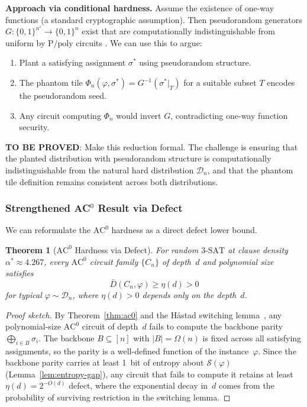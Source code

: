 \documentclass[11pt]{article}
\newtheorem{theorem}{Theorem}[section]
\theoremstyle{definition}
\theoremstyle{remark}
\newcommand{\calD}{\mathcal{D}}
\newcommand{\calS}{\mathcal{S}}
\newcommand{\Ppoly}{\mathrm{P/poly}}
\newcommand{\ACz}{\mathrm{AC}^0}
\newcommand{\threeSAT}{\mathrm{3\text{-}SAT}}
\begin{document}
\textbf{Approach via conditional hardness.}  Assume the existence of one-way
functions (a standard cryptographic assumption).  Then pseudorandom
generators $G: \{0,1\}^{n^\varepsilon} \to \{0,1\}^n$ exist that are
computationally indistinguishable from uniform by $\Ppoly$ circuits
\cite{HILL}.  We can use this to argue:

\begin{enumerate}
  \item Plant a satisfying assignment $\sigma^*$ using pseudorandom structure.
  \item The phantom tile $\Phi_n(\varphi, \sigma^*) = G^{-1}(\sigma^*|_T)$
    for a suitable subset $T$ encodes the pseudorandom seed.
  \item Any circuit computing $\Phi_n$ would invert $G$, contradicting one-way
    function security.
\end{enumerate}

\textbf{TO BE PROVED}: Make this reduction formal.  The challenge is
ensuring that the planted distribution with pseudorandom structure is
computationally indistinguishable from the natural hard distribution
$\calD_n$, and that the phantom tile definition remains consistent
across both distributions.

\subsubsection{Strengthened AC$^0$ Result via Defect}

We can reformulate the $\ACz$ hardness as a direct defect lower bound.

\begin{theorem}[$\ACz$ Hardness via Defect]
\label{thm:ac0-defect}
For random $\threeSAT$ at clause density $\alpha^* \approx 4.267$,
every $\ACz$ circuit family $\{C_n\}$ of depth~$d$ and polynomial size
satisfies
\[
  \bar{D}(C_n, \varphi) \geq \eta(d) > 0
\]
for typical $\varphi \sim \calD_n$, where $\eta(d) > 0$ depends only
on the depth~$d$.
\end{theorem}

\begin{proof}[Proof sketch]
By Theorem~\ref{thm:ac0} and the H\aa stad switching lemma~\cite{Hastad},
any polynomial-size $\ACz$ circuit of depth~$d$ fails to compute the
backbone parity $\bigoplus_{i \in B} \sigma_i$.  The backbone
$B \subseteq [n]$ with $|B| = \Omega(n)$ is fixed across all satisfying
assignments, so the parity is a well-defined function of the instance~$\varphi$.
Since the backbone parity carries at least 1~bit of entropy about
$\calS(\varphi)$ (Lemma~\ref{lem:entropy-gap}), any circuit that fails to
compute it retains at least $\eta(d) = 2^{-O(d)}$ defect, where the
exponential decay in~$d$ comes from the probability of surviving
restriction in the switching lemma.
\end{proof}
\end{document}
